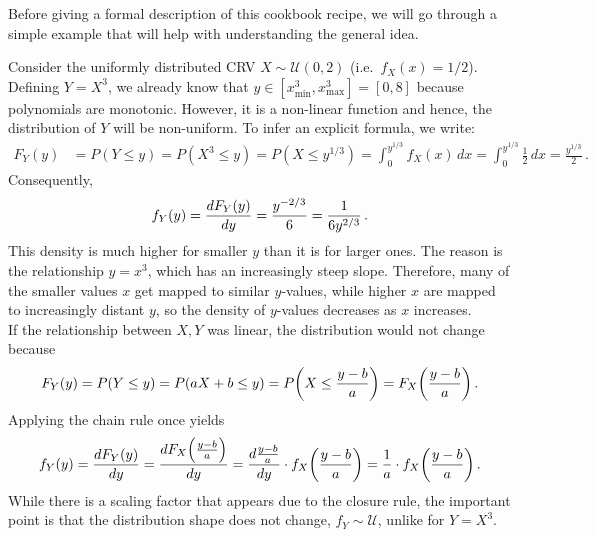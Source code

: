 Before giving a formal description of this cookbook recipe, we will go through a simple example that will help with understanding the general idea.



\begin{ex}\label{ex:non_lin_vs_lin_1}
Consider the uniformly distributed CRV $X \sim \mathcal{U}(0, 2)$ (i.e.~$f_X(x) = 1 / 2$). Defining $Y = X^3$, we already know that $y \in [x_\text{min}^3, x_\text{max}^3] = [0, 8]$ because polynomials are monotonic. However, it is a non-linear function and hence, the distribution of $Y$ will be non-uniform. To infer an explicit formula, we write:
\begin{align*}
F_Y(y) &= P(Y \leq y) = P(X^3 \leq y) = P(X \leq y^{1 / 3}) = \int_0^{y^{1 / 3}} f_X(x) \, dx = \int_0^{y^{1 / 3}} \frac{1}{2} \, dx = \frac{y^{1 / 3}}{2} \, .
\end{align*}
Consequently,
\begin{equation*}
f_Y(y) = \dv{F_Y(y)}{y} = \frac{y^{- 2 / 3}}{6} = \frac{1}{6 y^{2 / 3}} \, .
\end{equation*}
This density is much higher for smaller $y$ than it is for larger ones. The reason is the relationship $y = x^3$, which has an increasingly steep slope. Therefore, many of the smaller values $x$ get mapped to similar $y$-values, while higher $x$ are mapped to increasingly distant $y$, so the density of $y$-values decreases as $x$ increases.\\


If the relationship between $X, Y$ was linear, the distribution would not change because
\begin{equation*}
F_Y(y) = P(Y \leq y) = P(a X + b \leq y) = P\qty(X \leq \frac{y - b}{a}) = F_X\qty(\frac{y - b}{a}) \, .
\end{equation*}
Applying the chain rule once yields
\begin{equation*}
f_Y(y) = \dv{F_Y(y)}{y} = \dv{F_X\qty(\frac{y - b}{a})}{y} = \dv{\frac{y - b}{a}}{y} \cdot f_X\qty(\frac{y - b}{a}) = \frac{1}{a} \cdot f_X\qty(\frac{y - b}{a}) \, .%
\end{equation*}
While there is a scaling factor that appears due to the closure rule, the important point is that the distribution shape does not change, $f_Y \sim \mathcal{U}$, unlike for $Y = X^3$.


\end{ex}
